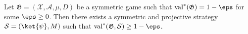 \begin{lemma}\label{lem:symmetric-strat}
	Let $\mathfrak G = (\mathcal X, \mathcal A, \mu, D)$ be a symmetric game such that $\operatorname{val}^*(\mathfrak G) = 1-\eps$ for some $\eps \ge 0$. Then there exists a symmetric and projective strategy $\mathcal S = (\ket{\psi}, M)$ such that $\operatorname{val}^*(\mathfrak G, \mathcal S) \ge 1-\eps$.
\end{lemma}
